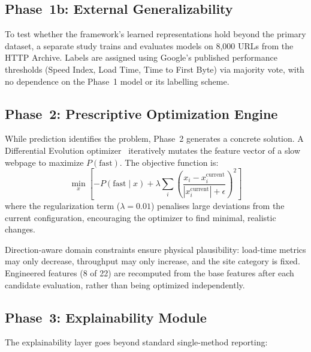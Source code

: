 \documentclass[sn-nature]{sn-jnl}
\begin{document}
\subsection{Phase~1b: External Generalizability}

To test whether the framework's learned representations hold beyond the primary dataset, a separate study trains and evaluates models on 8,000 URLs from the HTTP Archive. Labels are assigned using Google's published performance thresholds (Speed Index, Load Time, Time to First Byte) via majority vote, with no dependence on the Phase~1 model or its labelling scheme.

\subsection{Phase~2: Prescriptive Optimization Engine}

While prediction identifies the problem, Phase~2 generates a concrete solution. A Differential Evolution optimizer~\cite{asha2025} iteratively mutates the feature vector of a slow webpage to maximize $P(\text{fast})$. The objective function is:
\[
\min_{x}\left[-P(\text{fast} \mid x) + \lambda \sum_i \left(\frac{x_i - x_i^{\text{current}}}{|x_i^{\text{current}}| + \epsilon}\right)^{\!2}\right]
\]
where the regularization term ($\lambda = 0.01$) penalises large deviations from the current configuration, encouraging the optimizer to find minimal, realistic changes.

Direction-aware domain constraints ensure physical plausibility: load-time metrics may only decrease, throughput may only increase, and the site category is fixed. Engineered features (8 of 22) are recomputed from the base features after each candidate evaluation, rather than being optimized independently.

\subsection{Phase~3: Explainability Module}

The explainability layer goes beyond standard single-method reporting:
\end{document}
